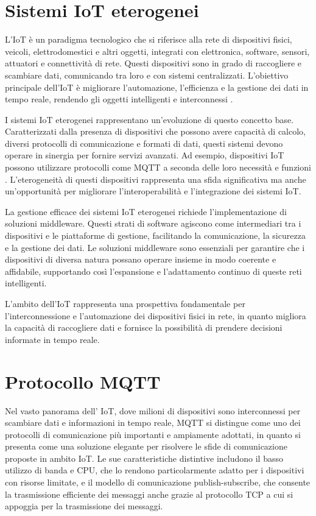 \documentclass[12pt,a4paper,openright,twoside]{book}
\begin{document}
\section{Sistemi IoT eterogenei}

L'\acf{IoT} è un paradigma tecnologico che si riferisce alla rete di dispositivi fisici, veicoli, elettrodomestici e altri oggetti, integrati con elettronica, 
software, sensori, attuatori e connettività di rete. Questi dispositivi sono in grado di raccogliere e scambiare dati, comunicando tra loro e con sistemi centralizzati. 
L'obiettivo principale dell'\ac{IoT} è migliorare l'automazione, l'efficienza e la gestione dei dati in tempo reale, rendendo gli oggetti intelligenti e interconnessi \cite{DBLP:journals/fgcs/GubbiBMP13}.

I sistemi \ac{IoT} eterogenei rappresentano un'evoluzione di questo concetto base. Caratterizzati dalla presenza di dispositivi che possono avere capacità di calcolo, 
diversi protocolli di comunicazione e formati di dati, questi sistemi devono operare in sinergia per fornire servizi avanzati. 
Ad esempio, dispositivi IoT possono utilizzare protocolli come \ac{MQTT} a seconda delle loro necessità e funzioni \cite{DBLP:journals/comsur/Al-FuqahaGMAA15}. 
L'eterogeneità di questi dispositivi rappresenta una sfida significativa ma anche un'opportunità per migliorare l'interoperabilità e l'integrazione dei sistemi \ac{IoT}.

La gestione efficace dei sistemi \ac{IoT} eterogenei richiede l'implementazione di soluzioni middleware. Questi strati di software agiscono come intermediari tra i dispositivi 
e le piattaforme di gestione, facilitando la comunicazione, la sicurezza e la gestione dei dati. Le soluzioni middleware sono essenziali per garantire che i dispositivi di 
diversa natura possano operare insieme in modo coerente e affidabile, supportando così l'espansione e l'adattamento continuo di queste reti intelligenti\cite{DBLP:journals/wpc/BandyopadhyayS11}.

L'ambito dell'\ac{IoT} rappresenta una prospettiva fondamentale per l'interconnessione e l'automazione dei dispositivi fisici in rete, 
in quanto migliora la capacità di raccogliere dati e fornisce la possibilità di prendere decisioni informate in tempo reale.

\section{Protocollo MQTT}

Nel vasto panorama dell' \acf{IoT}, dove milioni di dispositivi sono interconnessi per scambiare dati e informazioni in tempo reale, \acf{MQTT} 
si distingue come uno dei protocolli di comunicazione più importanti e ampiamente adottati, in quanto si presenta come una soluzione elegante per risolvere le sfide di 
comunicazione proposte in ambito \ac{IoT}. Le sue caratteristiche distintive includono il basso utilizzo di banda e CPU, che lo rendono particolarmente adatto per i 
dispositivi con risorse limitate, e il modello di comunicazione publish-subscribe, che consente la trasmissione efficiente dei messaggi anche grazie al protocollo 
\ac{TCP} a cui si appoggia per la trasmissione dei messaggi.
\end{document}
